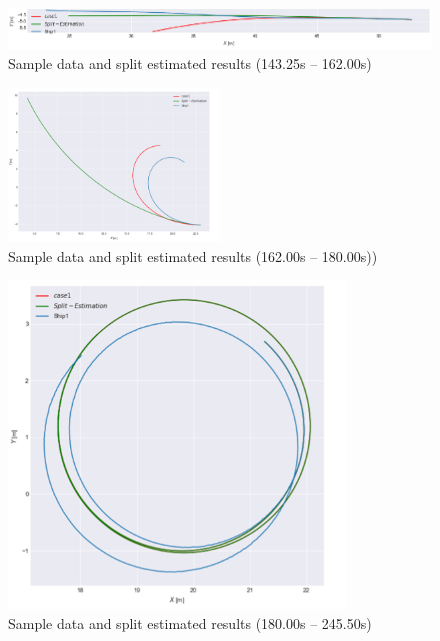 \begin{figure}[htbp]
    \centering   
    \includegraphics[width=1.0\textwidth]{img/appendix2/5-1.png}
    \caption{Sample data and split estimated results (143.25s – 162.00s)}
    \label{fig:5-1_png}
\end{figure}

\begin{figure}[htbp]
    \centering   
    \includegraphics[width=0.5\textwidth]{img/appendix2/5-2.png}
    \caption{Sample data and split estimated results (162.00s – 180.00s))}
    \label{fig:5-2_png}
\end{figure}

\begin{figure}[htbp]
    \centering   
    \includegraphics[width=0.8\textwidth]{img/appendix2/5-3.png}
    \caption{Sample data and split estimated results (180.00s – 245.50s)}
    \label{fig:5-3_png}
\end{figure}

